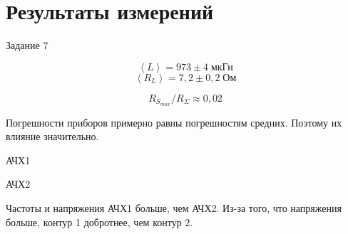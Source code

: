 \section{Результаты измерений}
\begin{table}[!ht]
    \centering
    \caption{Задание 7}
    \resizebox{\columnwidth}{!}{}
\end{table}
\[
    \left<L\right> = 973 \pm 4\;\text{мкГн}
\]
\[
    \left<R_{L}\right> = 7{,}2 \pm 0{,}2\;\text{Ом}
\]

\[
    R_{S_{max}} / R_{ \Sigma} \approx 0{,}02
\]

Погрешности приборов примерно равны погрешностям средних. Поэтому их влияние значительно.

\begin{table}[!ht]
    \centering
    \caption{АЧХ1}
    
\end{table}

\begin{table}[!ht]
    \centering
    \caption{АЧХ2}
    
\end{table}

\begin{figure}[ht!]
\end{figure}

Частоты и напряжения АЧХ1 больше, чем АЧХ2. Из-за того, что напряжения больше, контур 1 добротнее, чем контур 2.

\begin{figure}[ht!]
\end{figure}

